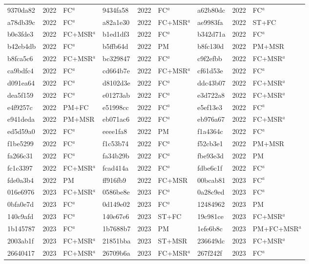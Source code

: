 \begin{longtable}{lll@{\hspace{10pt}}lll@{\hspace{10pt}}lll}
9370da82 & 2022 & FC$^{a}$ & 9434fa58 & 2022 & FC$^{a}$ & a62b80dc & 2022 & FC$^{a}$ \\
a78db39c & 2022 & FC$^{a}$ & a82a1e30 & 2022 & FC+MSR$^{a}$ & ae9983fa & 2022 & ST+FC \\
b0e3fde3 & 2022 & FC+MSR$^{a}$ & b1ed1df3 & 2022 & FC$^{a}$ & b342d71a & 2022 & FC$^{a}$ \\
b42eb4db & 2022 & FC$^{a}$ & b5ffb64d & 2022 & PM & b8fc130d & 2022 & PM+MSR \\
b8fca5c6 & 2022 & FC+MSR$^{a}$ & bc329847 & 2022 & FC$^{a}$ & c9f2efbb & 2022 & FC+MSR$^{a}$ \\
ca9bdfc4 & 2022 & FC$^{a}$ & cd664b7e & 2022 & FC+MSR$^{a}$ & cf61d53e & 2022 & FC$^{a}$ \\
d091ea64 & 2022 & FC$^{a}$ & d8102d3e & 2022 & FC$^{a}$ & ddc43b07 & 2022 & FC+MSR$^{a}$ \\
dea5f159 & 2022 & FC$^{a}$ & e01273ab & 2022 & FC$^{a}$ & e3d722a8 & 2022 & FC+MSR$^{a}$ \\
e4f9257c & 2022 & PM+FC & e51998cc & 2022 & FC$^{a}$ & e5ef13e3 & 2022 & FC$^{a}$ \\
e941deda & 2022 & PM+MSR & eb071ac6 & 2022 & FC$^{a}$ & eb976a67 & 2022 & FC+MSR$^{a}$ \\
ed5d59a0 & 2022 & FC$^{a}$ & eeee1fa8 & 2022 & PM & f1a4364c & 2022 & FC$^{a}$ \\
f1be5299 & 2022 & FC$^{a}$ & f1c53b74 & 2022 & FC$^{a}$ & f52cb3e1 & 2022 & PM+MSR \\
fa266c31 & 2022 & FC$^{a}$ & fa34b29b & 2022 & FC$^{a}$ & fbe93e3d & 2022 & PM \\
fc1c3397 & 2022 & FC+MSR$^{a}$ & fcad414a & 2022 & FC$^{a}$ & fdbe6c1f & 2022 & FC$^{a}$ \\
fde0a3b4 & 2022 & PM & ff916fb9 & 2022 & FC+MSR & 00bcab81 & 2023 & FC$^{a}$ \\
016e6976 & 2023 & FC+MSR$^{a}$ & 0586be8e & 2023 & FC$^{a}$ & 0a28c9ed & 2023 & FC$^{a}$ \\
0bfa0e7d & 2023 & FC$^{a}$ & 0d149e02 & 2023 & FC$^{a}$ & 12484962 & 2023 & PM \\
140c9afd & 2023 & FC$^{a}$ & 140e67e6 & 2023 & ST+FC & 19c981ce & 2023 & FC+MSR$^{a}$ \\
1b145787 & 2023 & FC$^{a}$ & 1b7688b7 & 2023 & PM & 1efe6b8c & 2023 & PM+FC+MSR$^{a}$ \\
2003ab1f & 2023 & FC+MSR$^{a}$ & 21851bba & 2023 & ST+MSR & 236649dc & 2023 & FC+MSR$^{a}$ \\
26640417 & 2023 & FC+MSR$^{a}$ & 26709b6a & 2023 & FC+MSR$^{a}$ & 267f242f & 2023 & FC$^{a}$ \\

\end{longtable}
